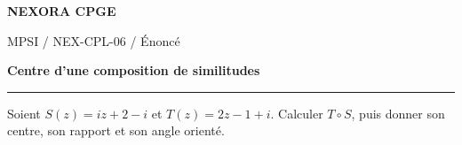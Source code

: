 \documentclass[11pt,a4paper]{article}
\begin{document}
{\small\bfseries\color{nexorablue} NEXORA CPGE}\par
{\small MPSI / NEX-CPL-06 / Énoncé}\par
{\LARGE\bfseries Centre d’une composition de similitudes}\par
\vspace{0.25em}\hrule\vspace{0.6em}

Soient $S(z)=iz+2-i$ et $T(z)=2z-1+i$. Calculer $T\circ S$, puis donner son centre, son rapport et son angle orienté.
\end{document}
